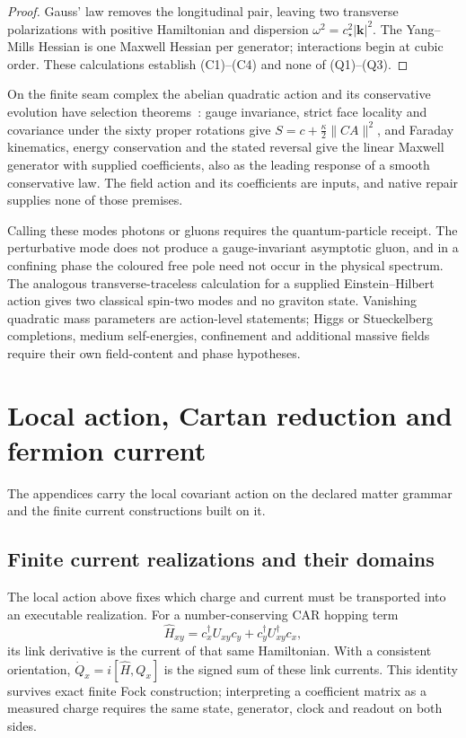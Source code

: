 \documentclass[11pt]{article}
\begin{document}
\begin{proof}
Gauss' law removes the longitudinal pair, leaving two transverse polarizations
with positive Hamiltonian and dispersion \(\omega^2=c_\star^2|\mathbf k|^2\). The
Yang--Mills Hessian is one Maxwell Hessian per generator; interactions begin
at cubic order. These calculations establish (C1)--(C4) and none of
(Q1)--(Q3).
\end{proof}

On the finite seam complex the abelian quadratic action and its conservative
evolution have selection theorems~\cite{ophmicrophysics}: gauge invariance, strict
face locality and covariance under the sixty proper rotations give
\(S=c+\frac\kappa2\|CA\|^2\), and Faraday kinematics, energy conservation and the stated
reversal give the linear Maxwell generator with supplied coefficients, also as the
leading response of a smooth conservative law. The field action and its coefficients
are inputs, and native repair supplies none of those premises.

Calling these modes photons or gluons requires the quantum-particle receipt.
The perturbative mode does not produce a gauge-invariant asymptotic gluon, and
in a confining phase the coloured free pole need not occur in the physical
spectrum. The analogous transverse-traceless calculation for a supplied
Einstein--Hilbert action gives two classical spin-two modes and no graviton
state. Vanishing quadratic mass parameters are action-level statements; Higgs
or Stueckelberg completions, medium self-energies, confinement and additional
massive fields require their own field-content and phase hypotheses.



\appendix
\section{Local action, Cartan reduction and fermion current}
\label{app:local-action}

The appendices carry the local covariant action on the declared matter
grammar and the finite current constructions built on it.


\subsection{Finite current realizations and their domains}
The local action above fixes which charge and current must be transported
into an executable realization. For a number-conserving CAR hopping term
\[
 \widehat H_{xy}=c_x^\dagger U_{xy}c_y+c_y^\dagger U_{xy}^\dagger c_x,
\]
its link derivative is the current of that same Hamiltonian. With a
consistent orientation, $\dot Q_x=i[\widehat H,Q_x]$ is the signed sum of
these link currents. This identity survives exact finite Fock construction;
interpreting a coefficient matrix as a measured charge requires the same
state, generator, clock and readout on both sides.
\end{document}
